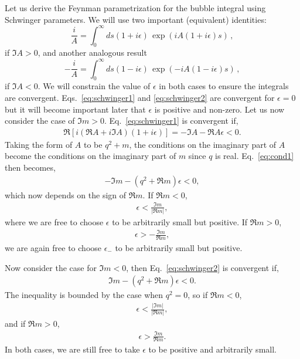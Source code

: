 \documentclass[twoside]{article}
\begin{document}
Let us derive the Feynman parametrization for the bubble integral using Schwinger parameters. We will use two important (equivalent) identities:
\begin{equation}
\label{eq:schwinger1}
  \frac{i}{A} = \int_0^\infty ds (1 + i\epsilon)\, \exp(i A (1 + i \epsilon)s)\,,
\end{equation}
if $\Im A >0$, and another analogous result
\begin{equation}
\label{eq:schwinger2}
-\frac{i}{A} = \int_0^\infty ds (1 - i\epsilon)\, \exp(-i A(1 - i\epsilon) s)\,,
\end{equation}
if $\Im A <0$. We will constrain the value of $\epsilon$ in both cases to ensure the integrals are convergent. Eqs.~\eqref{eq:schwinger1} and \eqref{eq:schwinger2} are
convergent for $\epsilon = 0$ but it will become important later that $\epsilon$ is positive and non-zero. Let us now consider the case of
$\Im m > 0$. Eq.~\eqref{eq:schwinger1} is convergent if,
\begin{align}
\label{eq:cond1}
  \Re\left[ i(\Re A + i \Im A)(1 + i\epsilon) \right] = -\Im A - \Re A \epsilon< 0.
\end{align}
Taking the form of $A$ to be $q^2 + m$, the conditions on the imaginary part of $A$ become the conditions on the imaginary part of
$m$ since $q$ is real. Eq.~\eqref{eq:cond1} then becomes,
\begin{align}
  -\Im m - (q^2 + \Re m)\epsilon < 0,
\end{align}
which now depends on the sign of $\Re m$. If $\Re m < 0$,
\begin{align}
  \epsilon < \frac{\Im m}{\lvert \Re m \rvert},
\end{align}
where we are free to choose $\epsilon$ to be arbitrarily small but positive. If $\Re m > 0$,
\begin{align}
  \epsilon > -\frac{\Im m}{\Re m},
\end{align}
we are again free to choose $\epsilon_-$ to be arbitrarily small but positive.

Now consider the case for $\Im m < 0$, then Eq.~\eqref{eq:schwinger2} is convergent if,
\begin{align}
  \Im m - (q^2 + \Re m)\epsilon < 0.
\end{align}
The inequality is bounded by the case when $q^2 = 0$, so if $\Re m < 0$,
\begin{align}
  \epsilon < \frac{\lvert \Im m\rvert}{\lvert \Re m\rvert},
\end{align}
and if $\Re m > 0$,
\begin{align}
  \epsilon > \frac{\Im m}{\Re m}.
\end{align}
In both cases, we are still free to take $\epsilon$ to be positive and arbitrarily small.
\end{document}
